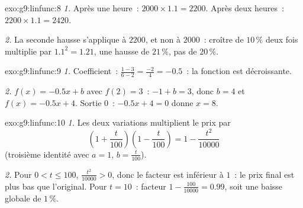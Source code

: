 \begin{solution}{exo:g9:linfunc:8}
\emph{1.} Après une heure~: $2000 \times 1.1 = 2200$. Après deux
heures~: $2200 \times 1.1 = 2420$.

\emph{2.} La seconde hausse s'applique à $2200$, et non à $2000$~:
croître de $10\,\%$ deux fois multiplie par $1.1^2 = 1.21$, une hausse
de $21\,\%$, pas de $20\,\%$.
\end{solution}

\begin{solution}{exo:g9:linfunc:9}
\emph{1.} Coefficient~: $\frac{1 - 3}{6 - 2} = \frac{-2}{4} = -0.5$~: la
fonction est décroissante.

\emph{2.} $f(x) = -0.5x + b$ avec $f(2) = 3$~: $-1 + b = 3$, donc
$b = 4$ et $f(x) = -0.5x + 4$. Sortie $0$~: $-0.5x + 4 = 0$ donne
$x = 8$.
\end{solution}

\begin{solution}{exo:g9:linfunc:10}
\emph{1.} Les deux variations multiplient le prix par
\[
\left(1 + \frac{t}{100}\right)\left(1 - \frac{t}{100}\right)
= 1 - \frac{t^2}{10000}
\]
(troisième identité avec $a = 1$, $b = \frac{t}{100}$).

\emph{2.} Pour $0 < t \leq 100$, $\frac{t^2}{10000} > 0$, donc le
facteur est inférieur à $1$~: le prix final est plus bas que l'original.
Pour $t = 10$~: facteur $1 - \frac{100}{10000} = 0.99$, soit une baisse
globale de $1\,\%$.
\end{solution}

